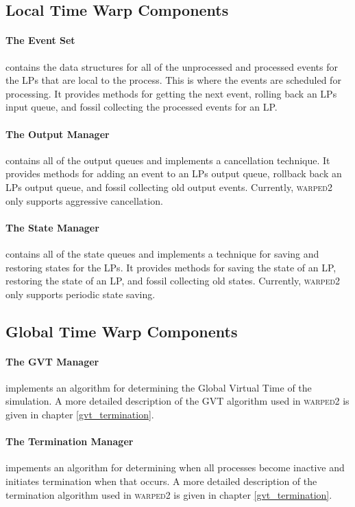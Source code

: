 \documentclass[11pt]{book}
\begin{document}
\subsection{Local Time Warp Components}

\paragraph{The Event Set} contains the data structures for all of the unprocessed and
processed events for the LPs that are local to the process. This is where the events are
scheduled for processing. It provides methods for getting the next event, rolling back an
LPs input queue, and fossil collecting the processed events for an LP.

\paragraph{The Output Manager} contains all of the output queues and implements a cancellation
technique. It provides methods for adding an event to an LPs output queue, rollback back an
LPs output queue, and fossil collecting old output events. Currently, \textsc{warped2} only
supports aggressive cancellation.

\paragraph{The State Manager} contains all of the state queues and implements a technique
for saving and restoring states for the LPs. It provides methods for saving the state of an
LP, restoring the state of an LP, and fossil collecting old states. Currently, \textsc{warped2}
only supports periodic state saving.

\subsection{Global Time Warp Components}

\paragraph{The GVT Manager} implements an algorithm for determining the Global Virtual Time
of the simulation. A more detailed description of the GVT algorithm used in \textsc{warped2}
is given in chapter \ref{gvt_termination}.

\paragraph{The Termination Manager} impements an algorithm for determining when all processes
become inactive and initiates termination when that occurs. A more detailed description of
the termination algorithm used in \textsc{warped2} is given in chapter \ref{gvt_termination}.
\end{document}
